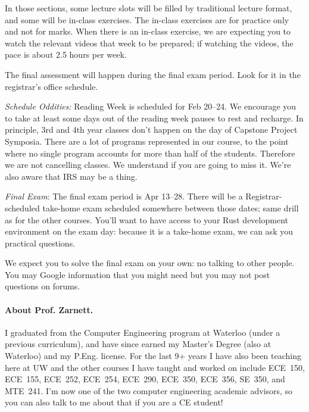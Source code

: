 In those sections, some lecture slots will be filled by traditional lecture format, and some will be in-class exercises. The in-class exercises are for practice only and not for marks. When there is an in-class exercise, we are expecting you to watch the relevant videos that week to be prepared; if watching the videos, the pace is about 2.5 hours per week.

  
The final assessment will happen during the final exam period. Look for it in the registrar's office schedule.

\textit{Schedule Oddities:} Reading Week is scheduled for Feb 20--24. We encourage you to take at least some days out of the reading week pauses to rest and recharge. In principle, 3rd and 4th year classes don't happen on the day of Capstone Project Symposia. There are a lot of programs represented in our course, to the point where no single program accounts for more than half of the students. Therefore we are not cancelling classes. We understand if you are going to miss it. We're also aware that IRS may be a thing.

\textit{Final Exam}: The final exam period is Apr 13--28. There will be a Registrar-scheduled take-home exam scheduled somewhere between those dates; same drill as for the other courses. You'll want to have access to your Rust development environment on the exam day: because it is a take-home exam, we can ask you practical questions.

We expect you to solve the final exam on your own: no talking to other people. You may Google information that you might need but you may not post questions on forums.


\paragraph{About Prof. Zarnett.}
I graduated from the Computer Engineering program at Waterloo (under a previous curriculum), and have since earned my Master's Degree (also at Waterloo) and my P.Eng. license. For the last 9+ years I have also been teaching here at UW and the other courses I have taught and worked on include ECE~150, ECE~155, ECE~252, ECE~254, ECE~290, ECE~350, ECE~356, SE~350, and MTE~241. I'm now one of the two computer engineering academic advisors, so you can also talk to me about that if you are a CE student! 

